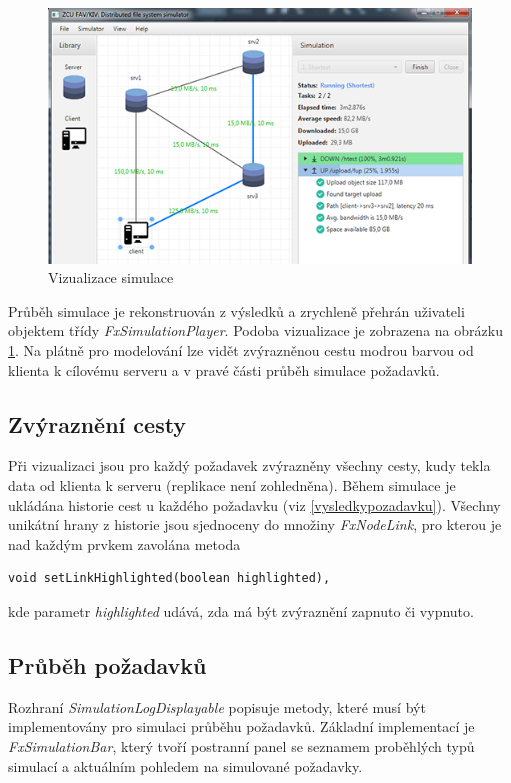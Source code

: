 \documentclass[czech,DP]{thesiskiv}
\begin{document}
\begin{figure}
\centering
	\includegraphics{img/vizualizace_simulace.png}
\caption{Vizualizace simulace}
\label{fig:vizualizace_simulace}
\end{figure}

Průběh simulace je rekonstruován z výsledků a zrychleně přehrán uživateli objektem třídy \textit{FxSimulationPlayer}. Podoba vizualizace je zobrazena na obrázku \ref{fig:vizualizace_simulace}. Na plátně pro modelování lze vidět zvýrazněnou cestu modrou barvou od klienta k cílovému serveru a v pravé části průběh simulace požadavků.

\subsection{Zvýraznění cesty}

Při vizualizaci jsou pro každý požadavek zvýrazněny všechny cesty, kudy tekla data od klienta k serveru (replikace není zohledněna). Během simulace je ukládána historie cest u každého požadavku (viz \ref{vysledkypozadavku}). Všechny unikátní hrany z historie jsou sjednoceny do množiny \textit{FxNodeLink}, pro kterou je nad každým prvkem zavolána metoda

\begin{verbatim}
void setLinkHighlighted(boolean highlighted),
\end{verbatim}
\noindent kde parametr \textit{highlighted} udává, zda má být zvýraznění zapnuto či vypnuto.

\subsection{Průběh požadavků}

Rozhraní \textit{SimulationLogDisplayable} popisuje metody, které musí být implementovány pro simulaci průběhu požadavků. Základní implementací je \textit{FxSimulationBar}, který tvoří postranní panel se seznamem proběhlých typů simulací a aktuálním pohledem na simulované požadavky.
\end{document}
